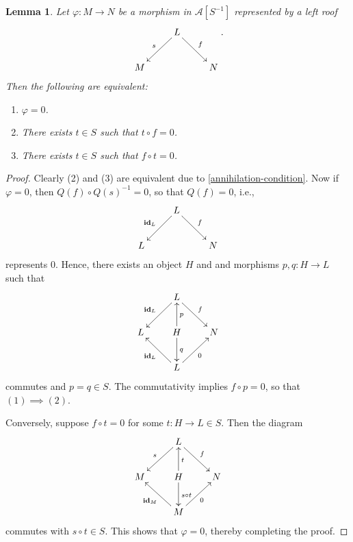 \documentclass[11pt]{article}
\theoremstyle{thmstyle}
\newtheorem{lemma}[theorem]{Lemma}
\theoremstyle{defstyle}
\newcommand{\id}{\mathbf{id}}
\newcommand{\scrA}{\mathscr{A}}
\begin{document}
\begin{lemma}
	Let $\varphi\colon M\to N$ be a morphism in $\scrA[S^{-1}]$ represented by a left roof 
	\begin{equation*}
		\xymatrix {
			& L\ar[ld]_s\ar[rd]^f & \\
			M & & N
		}.
	\end{equation*}
	Then the following are equivalent: 
	\begin{enumerate}[label=(\arabic*)]
		\item $\varphi = 0$.
		\item There exists $t\in S$ such that $t\circ f = 0$.
		\item There exists $t\in S$ such that $f\circ t = 0$.
	\end{enumerate}
\end{lemma}
\begin{proof}
	Clearly (2) and (3) are equivalent due to \ref{annihilation-condition}. Now if $\varphi = 0$, then $Q(f)\circ Q(s)^{-1} = 0$, so that $Q(f) = 0$, i.e., 
	\begin{equation*}
		\xymatrix {
			& L\ar[ld]_{\id_L}\ar[rd]^f &\\
			L & & N
		}
	\end{equation*}
	represents $0$. Hence, there exists an object $H$ and and morphisms $p, q\colon H\to L$ such that 
	\begin{equation*}
		\xymatrix {
			& L\ar[ld]_{\id_L}\ar[rd]^f &\\
			L & H\ar[u]_p\ar[d]^q & N\\
			& L\ar[lu]^{\id_L}\ar[ru]_0 & 
		}
	\end{equation*}
	commutes and $p = q\in S$. The commutativity implies $f\circ p = 0$, so that $(1)\implies(2)$.

	Conversely, suppose $f\circ t = 0$ for some $t\colon H\to L\in S$. Then the diagram 
	\begin{equation*}
		\xymatrix {
			& L\ar[ld]_s\ar[rd]^f & \\
			M & H\ar[u]_t\ar[d]^{s\circ t} & N\\
			& M\ar[lu]^{\id_M}\ar[ru]_0 & 
		}
	\end{equation*}
	commutes with $s\circ t\in S$. This shows that $\varphi = 0$, thereby completing the proof.
\end{proof}
\end{document}
